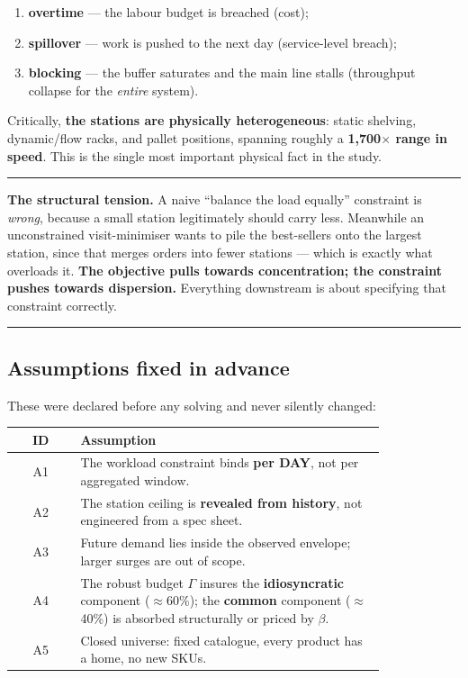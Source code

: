 \documentclass[11pt,a4paper]{article}
\newenvironment{keybox}
  {\par\medskip\noindent\rule{\linewidth}{0.9pt}\par\nobreak\smallskip\ignorespaces}
  {\par\smallskip\nobreak\noindent\rule{\linewidth}{0.9pt}\par\medskip}
\begin{document}
\begin{enumerate}
  \item \textbf{overtime} --- the labour budget is breached (cost);
  \item \textbf{spillover} --- work is pushed to the next day (service-level breach);
  \item \textbf{blocking} --- the buffer saturates and the main line stalls
        (throughput collapse for the \emph{entire} system).
\end{enumerate}

Critically, \textbf{the stations are physically heterogeneous}: static shelving,
dynamic/flow racks, and pallet positions, spanning roughly a
\textbf{1{,}700$\times$ range in speed}. This is the single most important
physical fact in the study.

\begin{keybox}
\textbf{The structural tension.} A naive ``balance the load equally''
constraint is \emph{wrong}, because a small station legitimately should carry
less. Meanwhile an unconstrained visit-minimiser wants to pile the
best-sellers onto the largest station, since that merges orders into fewer
stations --- which is exactly what overloads it. \textbf{The objective pulls
towards concentration; the constraint pushes towards dispersion.} Everything
downstream is about specifying that constraint correctly.
\end{keybox}

\subsection{Assumptions fixed in advance}
\label{sec:assumptions}

These were declared before any solving and never silently changed:

\begin{center}
\begin{tabular}{cp{0.82\linewidth}}
\toprule
ID & Assumption \\
\midrule
A1 & The workload constraint binds \textbf{per DAY}, not per aggregated window. \\
A2 & The station ceiling is \textbf{revealed from history}, not engineered from a spec sheet. \\
A3 & Future demand lies inside the observed envelope; larger surges are out of scope. \\
A4 & The robust budget $\Gamma$ insures the \textbf{idiosyncratic} component ($\approx$60\%); the \textbf{common} component ($\approx$40\%) is absorbed structurally or priced by $\beta$. \\
A5 & Closed universe: fixed catalogue, every product has a home, no new SKUs. \\
\bottomrule
\end{tabular}
\end{center}
\end{document}
